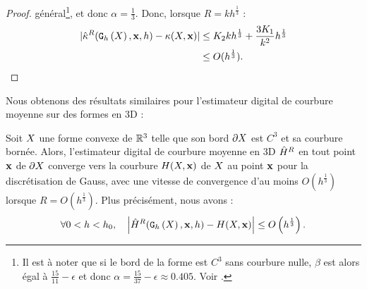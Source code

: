 \begin{proof}
  général\footnote{Il est à noter que si le bord de la forme est $C^3$ sans
  courbure nulle, $\beta$ est alors égal à $\frac{15}{11} - \epsilon$ et donc
  $\alpha = \frac{15}{37} - \epsilon \approx 0.405$. Voir
  .}, et donc $\alpha = \frac{1}{3}$. Donc,
  lorsque $R=kh^{\frac{1}{3}}$ :
  \begin{align}\label{eq-curvhat-error-bound-prelim4}
    | \hat{\kappa}^{R}(\mathtt{G}_{h}\left(X\right),\mathbf{x},h) - \kappa(X,\mathbf{x}) |
    &\le K_2kh^\frac{1}{3} + \frac{3K_1}{k^2}h^{\frac{1}{3}}\\
    &\le O(h^\frac{1}{3}).
  \end{align}
\end{proof}

Nous obtenons des résultats similaires pour l'estimateur digital de courbure
moyenne sur des formes en 3D :
%
\begin{theorem}{}
  \label{thm:convergence-curv-3d}
  Soit $X$ une forme convexe de $\mathbb{R}^3$ telle que son bord $\partial X$ est $C^3$ et
  sa courbure bornée. Alors, l'estimateur digital de courbure moyenne en 3D
  $\hat{H}^{R}$ en tout point $\mathbf{x}$ de $\partial X$ converge vers la
  courbure $H(X,\mathbf{x})$ de $X$ au point $\mathbf{x}$ pour la
  discrétisation de Gauss, avec une vitesse de convergence d'au moins
  $O(h^{\frac{1}{3}})$ lorsque $R = O(h^{\frac{1}{3}})$. Plus précisément, nous
  avons :
  \begin{equation}
    \forall 0 < h < h_0,
    \quad \left | \MeanCurvH{R}(\DSh, \vx, h) - \MeanCurv(\Shape, \vx) \right|
                          \le O \left(h^{\frac{1}{3}}\right). %
  \end{equation}
\end{theorem}
